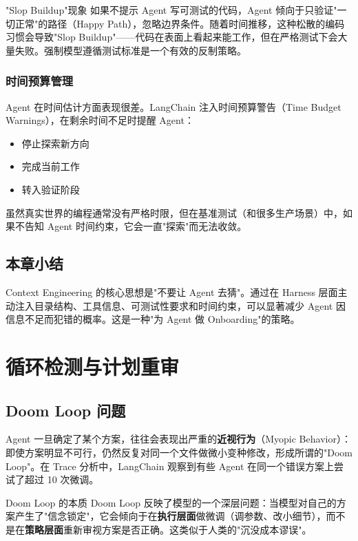\documentclass[a4paper]{article}
\begin{document}
\begin{warningbox}{"Slop Buildup"现象}
如果不提示 Agent 写可测试的代码，Agent 倾向于只验证"一切正常"的路径（Happy Path），忽略边界条件。随着时间推移，这种松散的编码习惯会导致"Slop Buildup"——代码在表面上看起来能工作，但在严格测试下会大量失败。强制模型遵循测试标准是一个有效的反制策略。
\end{warningbox}

\subsubsection{时间预算管理}

Agent 在时间估计方面表现很差。LangChain 注入时间预算警告（Time Budget Warnings），在剩余时间不足时提醒 Agent：
\begin{itemize}[leftmargin=1.5em]
    \item 停止探索新方向
    \item 完成当前工作
    \item 转入验证阶段
\end{itemize}

虽然真实世界的编程通常没有严格时限，但在基准测试（和很多生产场景）中，如果不告知 Agent 时间约束，它会一直"探索"而无法收敛。

\subsection{本章小结}

Context Engineering 的核心思想是"不要让 Agent 去猜"。通过在 Harness 层面主动注入目录结构、工具信息、可测试性要求和时间约束，可以显著减少 Agent 因信息不足而犯错的概率。这是一种"为 Agent 做 Onboarding"的策略。


\section{循环检测与计划重审}

\subsection{Doom Loop 问题}

Agent 一旦确定了某个方案，往往会表现出严重的\textbf{近视行为}（Myopic Behavior）：即使方案明显不可行，仍然反复对同一个文件做微小变种修改，形成所谓的"Doom Loop"。在 Trace 分析中，LangChain 观察到有些 Agent 在同一个错误方案上尝试了超过 10 次微调。

\begin{warningbox}{Doom Loop 的本质}
Doom Loop 反映了模型的一个深层问题：当模型对自己的方案产生了"信念锁定"，它会倾向于在\textbf{执行层面}做微调（调参数、改小细节），而不是在\textbf{策略层面}重新审视方案是否正确。这类似于人类的"沉没成本谬误"。
\end{warningbox}
\end{document}
